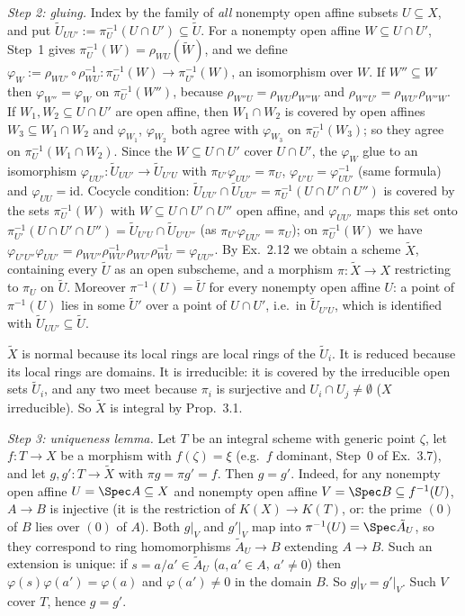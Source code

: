 \documentclass[11pt]{article}
\begin{document}
\emph{Step 2: gluing.} Index by the family of \emph{all} nonempty open affine subsets $U\subseteq X$, and put $\tilde U_{UU'}:=\pi_U^{-1}(U\cap U')\subseteq\tilde U$. For a nonempty open affine $W\subseteq U\cap U'$, Step~1 gives $\pi_U^{-1}(W)=\rho_{WU}(\tilde W)$, and we define $\varphi_W:=\rho_{WU'}\circ\rho_{WU}^{-1}:\pi_U^{-1}(W)\to\pi_{U'}^{-1}(W)$, an isomorphism over $W$. If $W''\subseteq W$ then $\varphi_{W''}=\varphi_W$ on $\pi_U^{-1}(W'')$, because $\rho_{W''U}=\rho_{WU}\rho_{W''W}$ and $\rho_{W''U'}=\rho_{WU'}\rho_{W''W}$. If $W_1,W_2\subseteq U\cap U'$ are open affine, then $W_1\cap W_2$ is covered by open affines $W_3\subseteq W_1\cap W_2$ and $\varphi_{W_1}$, $\varphi_{W_2}$ both agree with $\varphi_{W_3}$ on $\pi_U^{-1}(W_3)$; so they agree on $\pi_U^{-1}(W_1\cap W_2)$. Since the $W\subseteq U\cap U'$ cover $U\cap U'$, the $\varphi_W$ glue to an isomorphism $\varphi_{UU'}:\tilde U_{UU'}\to\tilde U_{U'U}$ with $\pi_{U'}\varphi_{UU'}=\pi_U$, $\varphi_{U'U}=\varphi_{UU'}^{-1}$ (same formula) and $\varphi_{UU}=\mathrm{id}$. Cocycle condition: $\tilde U_{UU'}\cap\tilde U_{UU''}=\pi_U^{-1}(U\cap U'\cap U'')$ is covered by the sets $\pi_U^{-1}(W)$ with $W\subseteq U\cap U'\cap U''$ open affine, and $\varphi_{UU'}$ maps this set onto $\pi_{U'}^{-1}(U\cap U'\cap U'')=\tilde U_{U'U}\cap\tilde U_{U'U''}$ (as $\pi_{U'}\varphi_{UU'}=\pi_U$); on $\pi_U^{-1}(W)$ we have $\varphi_{U'U''}\varphi_{UU'}=\rho_{WU''}\rho_{WU'}^{-1}\rho_{WU'}\rho_{WU}^{-1}=\varphi_{UU''}$. By Ex.~2.12 we obtain a scheme $\tilde X$, containing every $\tilde U$ as an open subscheme, and a morphism $\pi:\tilde X\to X$ restricting to $\pi_U$ on $\tilde U$. Moreover $\pi^{-1}(U)=\tilde U$ for every nonempty open affine $U$: a point of $\pi^{-1}(U)$ lies in some $\tilde U'$ over a point of $U\cap U'$, i.e.\ in $\tilde U_{U'U}$, which is identified with $\tilde U_{UU'}\subseteq\tilde U$.

$\tilde X$ is normal because its local rings are local rings of the $\tilde U_i$. It is reduced because its local rings are domains. It is irreducible: it is covered by the irreducible open sets $\tilde U_i$, and any two meet because $\pi_i$ is surjective and $U_i\cap U_j\ne\emptyset$ ($X$ irreducible). So $\tilde X$ is integral by Prop.~3.1.

\emph{Step 3: uniqueness lemma.} Let $T$ be an integral scheme with generic point $\zeta$, let $f:T\to X$ be a morphism with $f(\zeta)=\xi$ (e.g.\ $f$ dominant, Step~0 of Ex.~3.7), and let $g,g':T\to\tilde X$ with $\pi g=\pi g'=f$. Then $g=g'$. Indeed, for any nonempty open affine $U=\Spec A\subseteq X$ and nonempty open affine $V=\Spec B\subseteq f^{-1}(U)$, $A\to B$ is injective (it is the restriction of $K(X)\to K(T)$, or: the prime $(0)$ of $B$ lies over $(0)$ of $A$). Both $g|_V$ and $g'|_V$ map into $\pi^{-1}(U)=\Spec\tilde A_U$, so they correspond to ring homomorphisms $\tilde A_U\to B$ extending $A\to B$. Such an extension is unique: if $s=a/a'\in\tilde A_U$ ($a,a'\in A$, $a'\ne0$) then $\varphi(s)\varphi(a')=\varphi(a)$ and $\varphi(a')\ne0$ in the domain $B$. So $g|_V=g'|_V$. Such $V$ cover $T$, hence $g=g'$.
\end{document}
